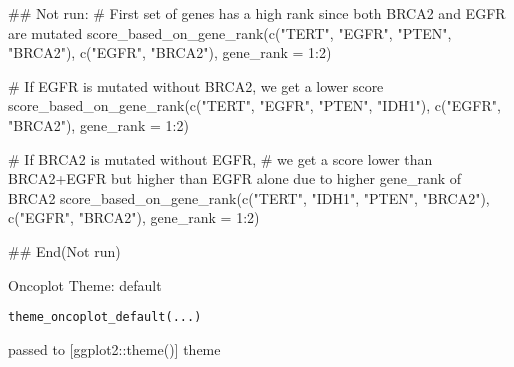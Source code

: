 \documentclass[a4paper]{book}
\begin{document}
\begin{Examples}
\begin{ExampleCode}
## Not run: 
# First set of genes has a high rank since both BRCA2 and EGFR are mutated
score_based_on_gene_rank(c("TERT", "EGFR", "PTEN", "BRCA2"), c("EGFR", "BRCA2"), gene_rank = 1:2)

# If EGFR is mutated without BRCA2, we get a lower score
score_based_on_gene_rank(c("TERT", "EGFR", "PTEN", "IDH1"), c("EGFR", "BRCA2"), gene_rank = 1:2)

# If BRCA2 is mutated without EGFR,
# we get a score lower than BRCA2+EGFR but higher than EGFR alone due to higher gene_rank of BRCA2
score_based_on_gene_rank(c("TERT", "IDH1", "PTEN", "BRCA2"), c("EGFR", "BRCA2"), gene_rank = 1:2)

## End(Not run)
\end{ExampleCode}
\end{Examples}
%
\begin{Description}\relax
Oncoplot Theme: default
\end{Description}
%
\begin{Usage}
\begin{verbatim}
theme_oncoplot_default(...)
\end{verbatim}
\end{Usage}
%
\begin{Arguments}
\begin{ldescription}
\item[\code{...}] passed to [ggplot2::theme()] theme
\end{ldescription}
\end{Arguments}
\printindex{}
\end{document}
